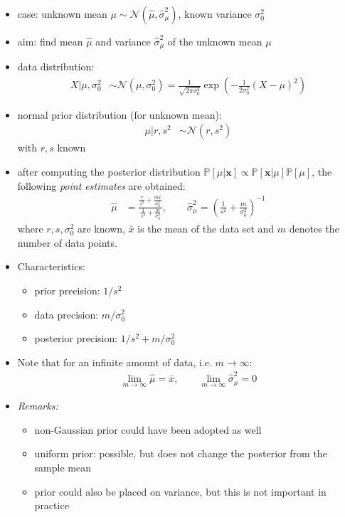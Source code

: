 \documentclass[a4paper,landscape,8pt,fleqn]{scrartcl}
\begin{document}
\begin{multicols*}{3}
\begin{itemize}
\item case: unknown mean $\mu \sim \mathcal{N}(\hat \mu, \hat \sigma_\mu^2)$, known variance $\sigma_0^2$
\item aim: find mean $\hat \mu$ and variance $\hat \sigma_\mu^2$ of the unknown mean $\mu$
\item data distribution:
\begin{align*}
X | \mu, \sigma_0^2 &\sim \mathcal{N}(\mu, \sigma_0^2) = \frac{1}{\sqrt{2\pi \sigma_0^2}} \exp \left( -\frac{1}{2\sigma_0^2} (X-\mu)^2 \right)
\end{align*}
\item normal prior distribution (for unknown mean):
\begin{align*}
\mu | r,s^2 &\sim \mathcal{N}(r,s^2)
\end{align*}
with $r,s$ known
\item after computing the posterior distribution $\mathbb{P}[\mu | \bm x] \propto \mathbb{P}[\bm x | \mu] \mathbb{P}[\mu]$, the following \textit{point estimates} are obtained:
\begin{align*}
\hat \mu &= \frac{\frac{r}{s^2} + \frac{m \bar x}{\sigma_0^2}}{\frac{1}{s^2} + \frac{m}{\sigma_0^2}}, \qquad
\hat \sigma_\mu^2 = \left( \frac{1}{s^2} + \frac{m}{\sigma_0^2} \right)^{-1}
\end{align*}
where $r,s,\sigma_0^2$ are known, $\bar x$ is the mean of the data set and $m$ denotes the number of data points.
\item Characteristics:
\begin{itemize}
\item prior precision: $1/s^2$
\item data precision: $m/\sigma_0^2$
\item posterior precision: $1/s^2 + m/\sigma_0^2$
\end{itemize}
\item Note that for an infinite amount of data, i.e. $m \to \infty$:
\begin{align*}
\lim_{m \to \infty} \hat \mu = \bar x, \qquad \lim_{m \to \infty} \hat \sigma_\mu^2 = 0
\end{align*}
\item \textit{Remarks:}
\begin{itemize}
\item non-Gaussian prior could have been adopted as well
\item uniform prior: possible, but does not change the posterior from the sample mean
\item prior could also be placed on variance, but this is not important in practice
\end{itemize}
\end{itemize}


\end{multicols*}
\end{document}
